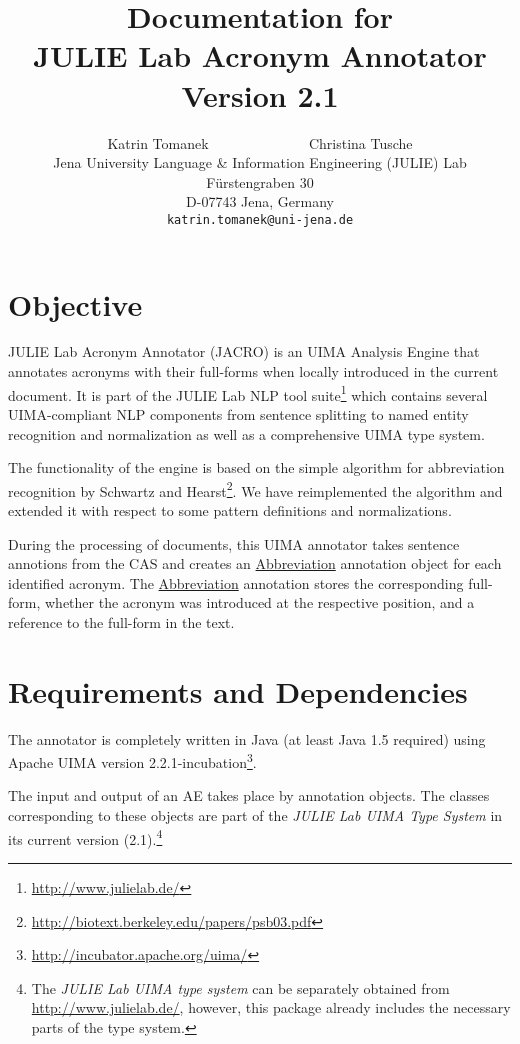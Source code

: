 \documentclass[11pt,a4paper,halfparskip]{scrartcl}
\title{\small{Documentation for}\\\huge JULIE Lab Acronym
  Annotator\\\vspace{3mm}\small{Version 2.1}}
\author{\normalsize Katrin Tomanek ~~~~~~~~~~~~~ Christina Tusche\\
  \normalsize  Jena University Language \& Information Engineering (JULIE) Lab\\
  \normalsize F\"urstengraben 30 \\
  \normalsize D-07743 Jena, Germany\\
  {\normalsize \tt katrin.tomanek@uni-jena.de} }
\date{}
\begin{document}
\maketitle

\section{Objective}

JULIE Lab Acronym Annotator (JACRO) is an UIMA Analysis Engine that
annotates acronyms with their full-forms when locally introduced in
the current document.  It is part of the JULIE Lab NLP tool
suite\footnote{\url{http://www.julielab.de/}} which contains several
UIMA-compliant NLP components from sentence splitting to named entity
recognition and normalization as well as a comprehensive UIMA type
system.

The functionality of the engine is based on the simple algorithm for
abbreviation recognition by Schwartz and
Hearst\footnote{\url{http://biotext.berkeley.edu/papers/psb03.pdf}}. We
have reimplemented the algorithm and extended it with respect to some
pattern definitions and normalizations. 

During the processing of documents, this UIMA annotator takes sentence
annotions from the CAS and creates an \url{Abbreviation} annotation
object for each identified acronym. The \url{Abbreviation} annotation
stores the corresponding full-form, whether the acronym was introduced
at the respective position, and a reference to the full-form in the
text.


\section{Requirements and Dependencies}

The annotator is completely written in Java (at least Java 1.5
required) using Apache UIMA version
2.2.1-incubation\footnote{\url{http://incubator.apache.org/uima/}}.

The input and output of an AE takes place by annotation objects. The
classes corresponding to these objects are part of the \emph{JULIE Lab
  UIMA Type System} in its current version (2.1).\footnote{The
  \emph{JULIE Lab UIMA type system} can be separately obtained from
  \url{http://www.julielab.de/}, however, this package already
  includes the necessary parts of the type system.}
\end{document}
